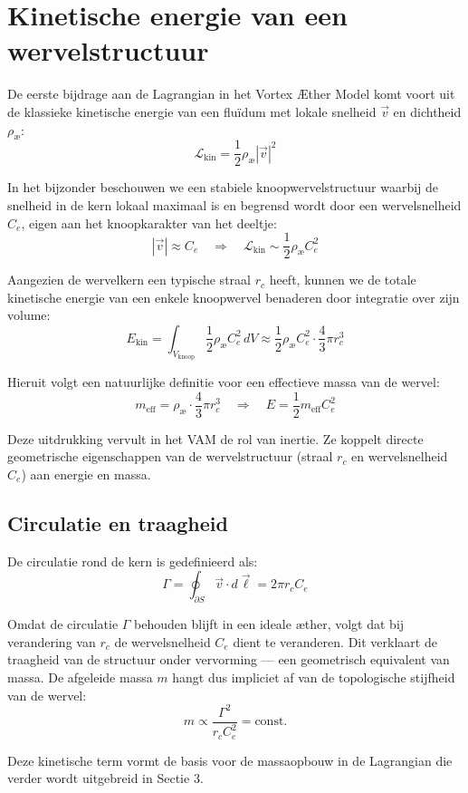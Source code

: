 \section{Kinetische energie van een wervelstructuur}

De eerste bijdrage aan de Lagrangian in het Vortex Æther Model komt voort uit de klassieke kinetische energie van een fluïdum met lokale snelheid $\vec{v}$ en dichtheid $\rho_\text{\ae}$:
\[
    \mathcal{L}_\text{kin} = \frac{1}{2} \rho_\text{\ae} |\vec{v}|^2
\]

In het bijzonder beschouwen we een stabiele knoopwervelstructuur waarbij de snelheid in de kern lokaal maximaal is en begrensd wordt door een wervelsnelheid $C_e$, eigen aan het knoopkarakter van het deeltje:
\[
    |\vec{v}| \approx C_e \quad \Rightarrow \quad \mathcal{L}_\text{kin} \sim \frac{1}{2} \rho_\text{\ae} C_e^2
\]

Aangezien de wervelkern een typische straal $r_c$ heeft, kunnen we de totale kinetische energie van een enkele knoopwervel benaderen door integratie over zijn volume:
\[
    E_\text{kin} = \int_{V_\text{knoop}} \frac{1}{2} \rho_\text{\ae} C_e^2 \, dV \approx \frac{1}{2} \rho_\text{\ae} C_e^2 \cdot \frac{4}{3}\pi r_c^3
\]

Hieruit volgt een natuurlijke definitie voor een effectieve massa van de wervel:
\[
    m_\text{eff} = \rho_\text{\ae} \cdot \frac{4}{3}\pi r_c^3
    \quad \Rightarrow \quad E = \frac{1}{2} m_\text{eff} C_e^2
\]

Deze uitdrukking vervult in het VAM de rol van inertie. Ze koppelt directe geometrische eigenschappen van de wervelstructuur (straal $r_c$ en wervelsnelheid $C_e$) aan energie en massa.

\subsection*{Circulatie en traagheid}
De circulatie rond de kern is gedefinieerd als:
\[
    \Gamma = \oint_{\partial S} \vec{v} \cdot d\vec{\ell} = 2\pi r_c C_e
\]

Omdat de circulatie $\Gamma$ behouden blijft in een ideale æther, volgt dat bij verandering van $r_c$ de wervelsnelheid $C_e$ dient te veranderen. Dit verklaart de traagheid van de structuur onder vervorming — een geometrisch equivalent van massa. De afgeleide massa $m$ hangt dus impliciet af van de topologische stijfheid van de wervel:
\[
    m \propto \frac{\Gamma^2}{r_c C_e^2} = \text{const.}
\]

Deze kinetische term vormt de basis voor de massaopbouw in de Lagrangian die verder wordt uitgebreid in Sectie 3.